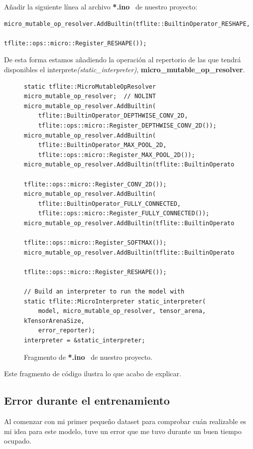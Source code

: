 Añadir la siguiente línea al archivo \small\textbf{*.ino}\normalsize~
de nuestro proyecto:
\begin{lstlisting}
micro_mutable_op_resolver.AddBuiltin(tflite::BuiltinOperator_RESHAPE,
                                      tflite::ops::micro::Register_RESHAPE());
\end{lstlisting}

De esta forma estamos añadiendo la operación al repertorio de las que tendrá
disponibles el interprete\small\textit{(static\_interpreter)}\normalsize,
\small\textbf{micro\_mutable\_op\_resolver}\normalsize.

\begin{figure}[h]
\begin{lstlisting}[firstnumber=72]
static tflite::MicroMutableOpResolver micro_mutable_op_resolver;  // NOLINT
micro_mutable_op_resolver.AddBuiltin(
    tflite::BuiltinOperator_DEPTHWISE_CONV_2D,
    tflite::ops::micro::Register_DEPTHWISE_CONV_2D());
micro_mutable_op_resolver.AddBuiltin(
    tflite::BuiltinOperator_MAX_POOL_2D,
    tflite::ops::micro::Register_MAX_POOL_2D());
micro_mutable_op_resolver.AddBuiltin(tflite::BuiltinOperator_CONV_2D,
                                     tflite::ops::micro::Register_CONV_2D());
micro_mutable_op_resolver.AddBuiltin(
    tflite::BuiltinOperator_FULLY_CONNECTED,
    tflite::ops::micro::Register_FULLY_CONNECTED());
micro_mutable_op_resolver.AddBuiltin(tflite::BuiltinOperator_SOFTMAX,
                                     tflite::ops::micro::Register_SOFTMAX());
micro_mutable_op_resolver.AddBuiltin(tflite::BuiltinOperator_RESHAPE,
                                     tflite::ops::micro::Register_RESHAPE());
                                     
// Build an interpreter to run the model with
static tflite::MicroInterpreter static_interpreter(
    model, micro_mutable_op_resolver, tensor_arena, kTensorArenaSize,
    error_reporter);
interpreter = &static_interpreter;
\end{lstlisting}
\caption{Fragmento de \small\textbf{*.ino}\normalsize~ de nuestro proyecto.}
\end{figure}

Este fragmento de código ilustra lo que acabo de explicar.


\subsection{Error durante el entrenamiento}
Al comenzar con mi primer pequeño dataset para comprobar cuán realizable es
mi idea para este modelo, tuve un error que me tuvo durante un buen tiempo
ocupado.

